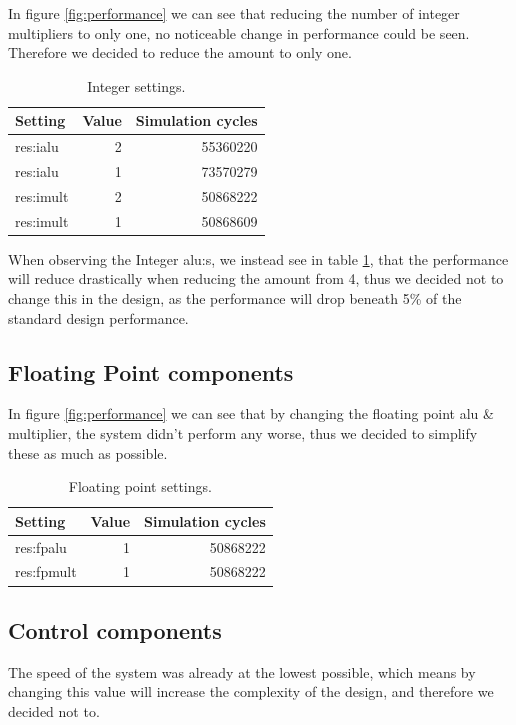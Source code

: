 \documentclass[titlepage, a4paper]{article}
\begin{document}
In figure \ref{fig:performance} we can see that reducing the number of integer multipliers to only one, no noticeable change in performance could be seen. Therefore we decided to reduce the amount to only one.

\begin{table}[H]
\centering
\caption{Integer settings.}

\begin{tabular}{|l|r|r|}
  \hline
  \textbf{Setting} & \textbf{Value} & \textbf{Simulation cycles}\\ \hline
  res:ialu & 2 & 55360220 \\ \hline
  res:ialu & 1 & 73570279 \\ \hline
  res:imult & 2 & 50868222 \\ \hline
  res:imult & 1 & 50868609 \\ \hline
\end{tabular}

\label{tab:integer}
\end{table}

When observing the Integer alu:s, we instead see in table \ref{tab:integer}, that the performance will reduce drastically when reducing the amount from 4, thus we decided not to change this in the design, as the performance will drop beneath 5\% of the standard design performance.

\subsection{Floating Point components}
In figure \ref{fig:performance} we can see that by changing the floating point alu \& multiplier, the system didn't perform any worse, thus we decided to simplify these as much as possible.

\begin{table}[H]
\centering
\caption{Floating point settings.}

\begin{tabular}{|l|r|r|}
  \hline
  \textbf{Setting} & \textbf{Value} & \textbf{Simulation cycles}\\ \hline
  res:fpalu & 1 & 50868222 \\ \hline
  res:fpmult & 1 & 50868222 \\ \hline
\end{tabular}

\label{tab:floatingpoint}
\end{table}

\subsection{Control components}
The speed of the system was already at the lowest possible, which means by changing this value will increase the complexity of the design, and therefore we decided not to.
\end{document}
